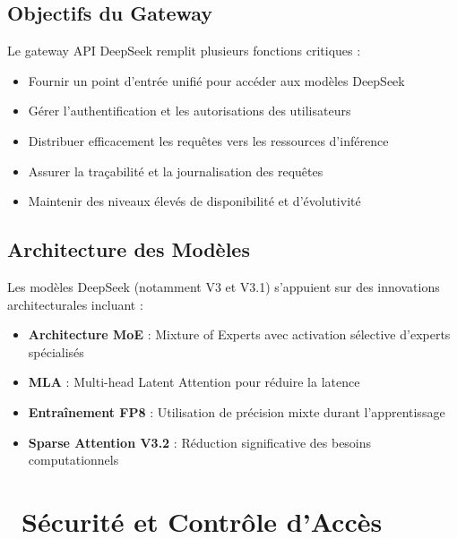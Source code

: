 \documentclass[12pt,a4paper]{article}
\begin{document}
\subsection{Objectifs du Gateway}
Le gateway API DeepSeek remplit plusieurs fonctions critiques :
\begin{itemize}[leftmargin=*,label={\color{primary}\faCheck}]
    \item Fournir un point d'entrée unifié pour accéder aux modèles DeepSeek
    \item Gérer l'authentification et les autorisations des utilisateurs
    \item Distribuer efficacement les requêtes vers les ressources d'inférence
    \item Assurer la traçabilité et la journalisation des requêtes
    \item Maintenir des niveaux élevés de disponibilité et d'évolutivité
\end{itemize}

\subsection{Architecture des Modèles}
Les modèles DeepSeek (notamment V3 et V3.1) s'appuient sur des innovations architecturales incluant :

\begin{tcolorbox}[
    enhanced,
    colback=light,
    colframe=accent,
    boxrule=0pt,
    frame hidden,
    borderline west={3pt}{0pt}{accent},
    sharp corners
]
\begin{itemize}[leftmargin=*,label={\color{accent}\faCogs}]
    \item \textbf{Architecture MoE} : Mixture of Experts avec activation sélective d'experts spécialisés
    \item \textbf{MLA} : Multi-head Latent Attention pour réduire la latence
    \item \textbf{Entraînement FP8} : Utilisation de précision mixte durant l'apprentissage
    \item \textbf{Sparse Attention V3.2} : Réduction significative des besoins computationnels
\end{itemize}
\end{tcolorbox}

\newpage
\section{\faShieldAlt\ Sécurité et Contrôle d'Accès}
\end{document}
